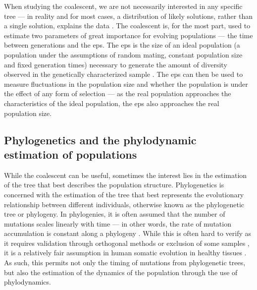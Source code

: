 When studying the coalescent, we are not necessarily interested in any specific tree --- in reality and for most cases, a distribution of likely solutions, rather than a single solution, explains the data \cite{Gillespie2004-xo}. The coalescent is, for the most part, used to estimate two parameters of great importance for evolving populations --- the time between generations and the \ac{eps}. The \ac{eps} is the size of an ideal population (a population under the assumptions of random mating, constant population size and fixed generation times) necessary to generate the amount of diversity observed in the genetically characterized sample \cite{Gillespie2004-xo}. The \ac{eps} can then be used to measure fluctuations in the population size and whether the population is under the effect of any form of selection --- as the real population approaches the characteristics of the ideal population, the \ac{eps} also approaches the real population size.

\subsection{Phylogenetics and the phylodynamic estimation of populations}

While the coalescent can be useful, sometimes the interest lies in the estimation of the tree that best describes the population structure. Phylogenetics is concerned with the estimation of the tree that best represents the evolutionary relationship between different individuals, otherwise known as the phylogenetic tree or phylogeny. In phylogenies, it is often assumed that the number of mutations scales linearly with time --- in other words, the rate of mutation accumulation is constant along a phylogeny \cite{Roy2014-ez}. While this is often hard to verify as it requires validation through orthogonal methods or exclusion of some samples \cite{Roy2014-ez}, it is a relatively fair assumption in human somatic evolution in healthy tissues \cite{Abascal_2021_gjvqfm,Mitchell2021-zl,Fabre2020-as}. As such, this permits not only the timing of mutations from phylogenetic trees, but also the estimation of the dynamics of the population through the use of phylodynamics. 

